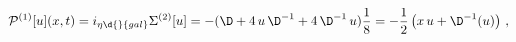 \begin{equation*}
{\mathcal{P}}^{(1)}[u](x,t) = i_{\eta\d{}{gal}}\Sigma^{(2)}[u] = -(\D +
4\,u\,\D^{-1} + 4\,\D^{-1}\,u)\frac{1}{8} = -\frac{1}{2}\left(x\,u +
\D^{-1}(u)\right)\,,
\end{equation*}

